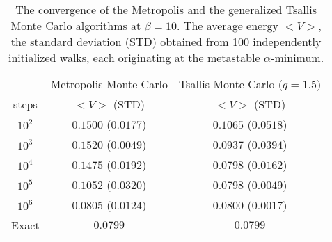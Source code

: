 \newpage
\begin{table}[th]
\caption{The convergence of the Metropolis and the generalized  Tsallis Monte Carlo algorithms at $\beta=10$. The average energy  $<V>$, the standard deviation (STD) obtained from 100 independently initialized walks, each originating at the  metastable $\alpha$-minimum.}

\vspace{4mm}
\begin{tabular}{c|c|c}
\hline
&Metropolis Monte Carlo & Tsallis Monte Carlo ($q=1.5)$ \\
steps & $<V>$ (STD) & $<V>$ (STD) \\
\hline
$10^{2}$ & $0.1500$ ($0.0177$) &$0.1065$ ($0.0518$) \\
$10^{3}$ & $0.1520$ ($0.0049$) &$0.0937$ ($0.0394$) \\
$10^{4}$ & $0.1475$ ($0.0192$) &$0.0798$ ($0.0162$) \\
$10^{5}$ & $0.1052$ ($0.0320$) &$0.0798$ ($0.0049$) \\
$10^{6}$ & $0.0805$ ($0.0124$) &$0.0800$ ($0.0017$) \\
Exact & $0.0799$ & $0.0799$ \\
\hline
\end{tabular}
\end{table}

